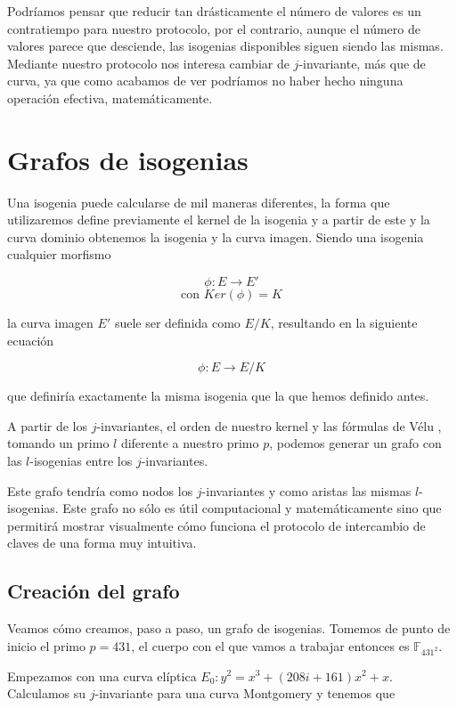 Podríamos pensar que reducir tan drásticamente el número de valores es un contratiempo para nuestro protocolo, por el contrario, aunque el número de valores parece que desciende, las isogenias disponibles siguen siendo las mismas. Mediante nuestro protocolo nos interesa cambiar de $j$-invariante, más que de curva, ya que como acabamos de ver podríamos no haber hecho ninguna operación efectiva, matemáticamente.

%
%

\section{Grafos de isogenias}

Una isogenia puede calcularse de mil maneras diferentes, la forma que utilizaremos define previamente el kernel de la isogenia y a partir de este y la curva dominio obtenemos la isogenia y la curva imagen. Siendo una isogenia cualquier morfismo 

\[\phi : E \to E'\]
\[\text{con }Ker(\phi) = K\] 

la curva imagen $E'$ suele ser definida como $E/K$, resultando en la siguiente ecuación

\[\phi : E \to E/K\]

que definiría exactamente la misma isogenia que la que hemos definido antes.

A partir de los $j$-invariantes, el orden de nuestro kernel y las fórmulas de Vélu \cite{velu}, tomando un primo $l$ diferente a nuestro primo $p$, podemos generar un grafo con las $l$-isogenias  entre los $j$-invariantes.

Este grafo tendría como nodos los $j$-invariantes y como aristas las mismas $l$-isogenias. Este grafo no sólo es útil computacional y matemáticamente sino que permitirá mostrar visualmente cómo funciona el protocolo de intercambio de claves de una forma muy intuitiva.

\subsection{Creación del grafo}

Veamos cómo creamos, paso a paso, un grafo de isogenias. Tomemos de punto de inicio el primo $p=431$, el cuerpo con el que vamos a trabajar entonces es $\mathbb F_{431^2}$.

Empezamos con una curva elíptica $E_0: y^2 = x^3 + (208i+161) x^2 + x$. Calculamos su $j$-invariante para una curva Montgomery y tenemos que 

